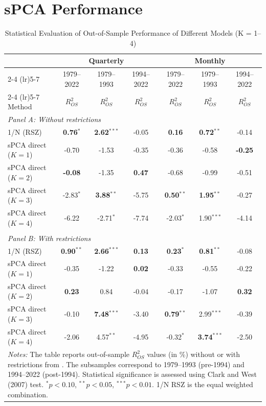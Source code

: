 \documentclass[a4paper,11pt]{article}
\begin{document}
\section{sPCA Performance}
\begin{table}[H]
\centering
\caption{Statistical Evaluation of Out-of-Sample Performance of Different Models (K = 1--4)}
\label{tab:spca_results_full_benchmarks}
\small
\begin{tabular}{lcccccc}
\hline
 & \multicolumn{3}{c}{Quarterly} & \multicolumn{3}{c}{Monthly} \\
\cmidrule(lr){2-4} \cmidrule(lr){5-7}
 & 1979--2022 & 1979--1993 & 1994--2022 
 & 1979--2022 & 1979--1993 & 1994--2022 \\
\cmidrule(lr){2-4} \cmidrule(lr){5-7}
Method 
& $R^2_{OS}$ & $R^2_{OS}$ & $R^2_{OS}$ 
& $R^2_{OS}$ & $R^2_{OS}$ & $R^2_{OS}$ \\
\hline
\multicolumn{7}{l}{\textit{Panel A: Without \citet{campbellthompson2008} restrictions}} \\[0.5ex]
1/N (RSZ) 
& \textbf{0.76}$^{*}$ & \textbf{2.62}$^{***}$ & -0.05 
& \textbf{0.16} & \textbf{0.72}$^{**}$ & -0.14 \\
\hline
sPCA direct ($K=1$) 
& -0.70 & -1.53 & -0.35 
& -0.36 & -0.58 & \textbf{-0.25} \\
sPCA direct ($K=2$) 
& \textbf{-0.08} & -1.35 & \textbf{0.47} 
& -0.68 & -0.99 & -0.51 \\
sPCA direct ($K=3$) 
& -2.83$^{*}$ & \textbf{3.88}$^{**}$ & -5.75 
& \textbf{0.50}$^{**}$ & \textbf{1.95}$^{**}$ & -0.27 \\
sPCA direct ($K=4$) 
& -6.22 & -2.71$^{*}$ & -7.74 
& -2.03$^{*}$ & 1.90$^{***}$ & -4.14 \\
\\[1ex]
\multicolumn{7}{l}{\textit{Panel B: With \citet{campbellthompson2008} restrictions}} \\[0.5ex]
1/N (RSZ) 
& \textbf{0.90}$^{**}$ & \textbf{2.66}$^{***}$ & \textbf{0.13} 
& \textbf{0.23}$^{*}$ & \textbf{0.81}$^{**}$ & -0.08 \\
\hline
sPCA direct ($K=1$) 
& -0.35 & -1.22 & \textbf{0.02} 
& -0.33 & -0.55 & -0.22 \\
sPCA direct ($K=2$) 
& \textbf{0.23} & 0.84 & -0.04 
& -0.17 & -1.07 & \textbf{0.32} \\
sPCA direct ($K=3$) 
& -0.10 & \textbf{7.48}$^{***}$ & -3.40 
& \textbf{0.79}$^{**}$ & 2.99$^{***}$ & -0.39 \\
sPCA direct ($K=4$) 
& -2.06 & 4.57$^{**}$ & -4.95 
& -0.32$^{*}$ & \textbf{3.74}$^{***}$ & -2.50 \\
\hline
\multicolumn{7}{p{0.85\textwidth}}{\footnotesize \textit{Notes:} The table reports out-of-sample $R^2_{OS}$ values (in \%) without or with restrictions from \citet{campbellthompson2008}. The subsamples correspond to
1979--1993 (pre-1994) and 1994--2022 (post-1994). Statistical significance is
assessed using Clark and West (2007) test. $^{*}p < 0.10$, $^{**}p < 0.05$, $^{***}p < 0.01$. 1/N RSZ is the \citet{rsz2010} equal weighted combination.} 
\end{tabular}
\end{table}
\end{document}
